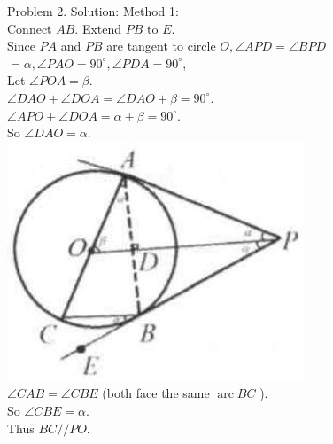 \documentclass[10pt]{article}
\begin{document}
Problem 2. Solution:
Method 1:\\
Connect \(A B\). Extend \(P B\) to \(E\).\\
Since \(P A\) and \(P B\) are tangent to circle \(O, \angle A P D=\angle B P D\) \(=\alpha, \angle P A O=90^{\circ}, \angle P D A=90^{\circ}\),\\
Let \(\angle P O A=\beta\).\\
\(\angle D A O+\angle D O A=\angle D A O+\beta=90^{\circ}\).\\
\(\angle A P O+\angle D O A=\alpha+\beta=90^{\circ}\).\\
So \(\angle D A O=\alpha\).\\
\includegraphics[max width=\textwidth, center]{2025_04_17_97bc1f7e44d93c271a88g-171(1)}\\
\(\angle C A B=\angle C B E\) (both face the same \(\operatorname{arc} B C\) ).\\
So \(\angle C B E=\alpha\).\\
Thus \(B C / / P O\).
\end{document}

